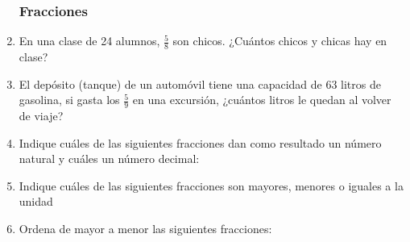\documentclass[letterpaper,11pt,twoside]{article}
\begin{document}
\begin{enumerate}
\subsubsection*{Fracciones}
\item En una clase de 24 alumnos, $\frac{5}{8}$ son chicos. ¿Cuántos chicos y chicas hay en clase?
\item El depósito (tanque) de un autom\'{o}vil tiene una capacidad de 63 litros de gasolina, si gasta los $\frac{5}{9}$ en una excursi\'{o}n, ¿cu\'{a}ntos litros le quedan al volver de viaje?
\item Indique cu\'{a}les de las siguientes fracciones dan como resultado un n\'{u}mero natural y cu\'{a}les un n\'{u}mero decimal:
\begin{enumerate}
\end{enumerate}
\item Indique cu\'{a}les de las siguientes fracciones son mayores, menores o iguales a la unidad
\begin{enumerate}
\end{enumerate}
\item Ordena de mayor a menor las siguientes fracciones:
\begin{enumerate}

\end{enumerate}
\end{enumerate}
\end{document}
